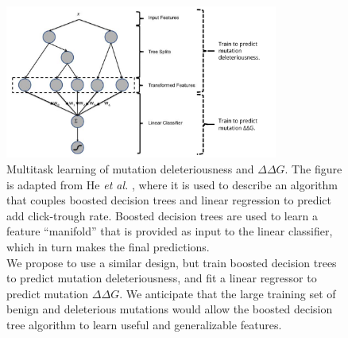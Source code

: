 \begin{figure}[tb]
	\centering
	\includegraphics[width=0.8\textwidth]{static/elaspic/multitask_learning.pdf}
	\caption[Multitask learning of mutation deleteriousness and $\Delta \Delta G$.]{
		Multitask learning of mutation deleteriousness and $\Delta \Delta G$.
        The figure is adapted from He \textit{et al.} \cite{he_practical_2014}, where it is used to describe an algorithm that couples boosted decision trees and linear regression to predict add click-trough rate. Boosted decision trees are used to learn a feature ``manifold'' that is provided as input to the linear classifier, which in turn makes the final predictions. \\
        We propose to use a similar design, but train boosted decision trees to predict mutation deleteriousness, and fit a linear regressor to predict mutation $\Delta \Delta G$. We anticipate that the large training set of benign and deleterious mutations would allow the boosted decision tree algorithm to learn useful and generalizable features.
	}
	\label{fig:multitask_learning}
\end{figure}
